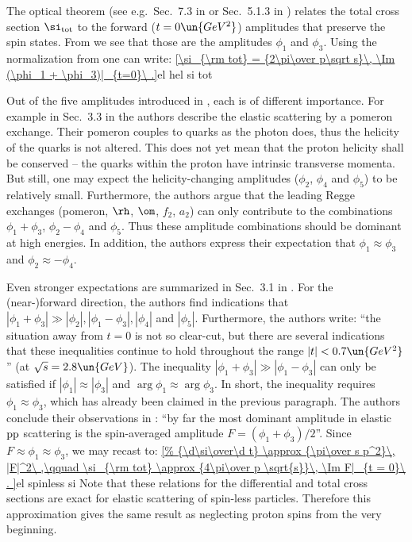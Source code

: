 The optical theorem (see e.g.~Sec.~7.3 in  or Sec.~5.1.3 in ) relates the total cross section $\si_{\rm tot}$ to the forward ($t=0\un{GeV^2}$) amplitudes that preserve the spin states. From  we see that those are the amplitudes $\phi_1$ and $\phi_3$. Using the normalization from  one can write:
\eqref{\si_{\rm tot} = {2\pi\over p\sqrt s}\, \Im (\phi_1 + \phi_3)|_{t=0}\ .}{el hel si tot}

Out of the five amplitudes introduced in , each is of different importance. For example in Sec.~3.3 in  the authors describe the elastic scattering by a pomeron exchange. Their pomeron couples to quarks as the photon does, thus the helicity of the quarks is not altered. This does not yet mean that the proton helicity shall be conserved -- the quarks within the proton have intrinsic transverse momenta. But still, one may expect the helicity-changing amplitudes ($\phi_2$, $\phi_4$ and $\phi_5$) to be relatively small. Furthermore, the authors argue that the leading Regge exchanges (pomeron, $\rm\rh$, $\rm\om$, $f_2$, $a_2$) can only contribute to the combinations $\phi_1+\phi_3$, $\phi_2 - \phi_4$ and $\phi_5$. Thus these amplitude combinations should be dominant at high energies. In addition, the authors express their expectation that $\phi_1 \approx \phi_3$ and $\phi_2 \approx - \phi_4$.

Even stronger expectations are summarized in Sec.~3.1 in . For the (near-)forward direction, the authors find indications that $|\phi_1 + \phi_3| \gg |\phi_2|, |\phi_1-\phi_3|, |\phi_4|$ and $|\phi_5|$. Furthermore, the authors write: ``the situation away from $t=0$ is not so clear-cut, but there are several indications that these inequalities continue to hold throughout the range $|t| < 0.7\un{GeV^2}$'' (at $\sqrt s = 2.8\un{GeV}$). The inequality $|\phi_1 + \phi_3| \gg |\phi_1-\phi_3|$ can only be satisfied if $|\phi_1| \approx |\phi_3|$ and $\arg\phi_1 \approx \arg\phi_3$. In short, the inequality requires $\phi_1 \approx \phi_3$, which has already been claimed in the previous paragraph. The authors conclude their observations in : ``by far the most dominant amplitude in elastic $\rm pp$ scattering is the spin-averaged amplitude $F = (\phi_1+\phi_3)/2$''. Since $F\approx \phi_1 \approx \phi_3$, we may recast  to:
\eqref{%
	{\d\si\over\d t} \approx {\pi\over s p^2}\, |F|^2\ ,\qquad
	\si_{\rm tot} \approx {4\pi\over p \sqrt{s}}\, \Im F|_{t = 0}\ .
}{el spinless si}
Note that these relations for the differential and total cross sections are exact for elastic scattering of spin-less particles. Therefore this approximation gives the same result as neglecting proton spins from the very beginning.

